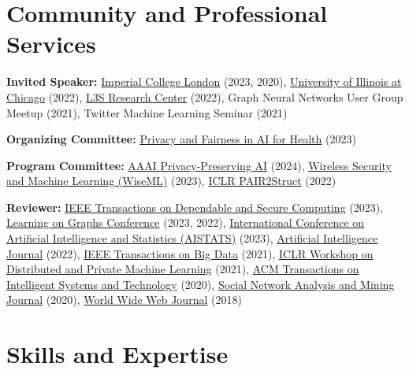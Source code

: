 \documentclass[11pt]{article}
\begin{document}
\section{Community and Professional Services}

\begin{outerlist}
  \item \textbf{Invited Speaker:}\quad
  \href{https://www.imperial.ac.uk/}{Imperial College London} (2023, 2020), \href{https://www.uic.edu/}{University of Illinois at Chicago} (2022), \href{https://www.l3s.de/}{L3S Research Center} (2022), Graph Neural Networks User Group Meetup (2021), Twitter Machine Learning Seminar (2021)

	\item \textbf{Organizing Committee:}\quad
	\href{https://priv-fair-ai-uk.github.io}{Privacy and Fairness in AI for Health} (2023)

	\item \textbf{Program Committee:}\quad
  \href{https://ppai-workshop.github.io/}{AAAI Privacy-Preserving AI} (2024),
	\href{https://wisec2023.surrey.ac.uk/wiseml2023/}{Wireless Security and Machine Learning (WiseML)} (2023),
	\href{https://pair2struct-workshop.github.io/}{ICLR PAIR2Struct} (2022)

	\item \textbf{Reviewer:}\quad
	\href{https://ieeexplore.ieee.org/xpl/aboutJournal.jsp?punumber=8858}{IEEE Transactions on Dependable and Secure Computing} (2023),
	\href{https://logconference.org/}{Learning on Graphs Conference} (2023, 2022),
  \href{http://aistats.org/aistats2023/}{International Conference on Artificial Intelligence and Statistics (AISTATS)} (2023),
	\href{https://www.journals.elsevier.com/artificial-intelligence}{Artificial Intelligence Journal} (2022),
	\href{https://ieeexplore.ieee.org/xpl/RecentIssue.jsp?punumber=6687317}{IEEE Transactions on Big Data} (2021),
	\href{https://dp-ml.github.io/2021-workshop-ICLR/}{ICLR Workshop on Distributed and Private Machine Learning} (2021),
	\href{https://dl.acm.org/journal/tist}{ACM Transactions on Intelligent Systems and Technology} (2020),
	\href{https://www.springer.com/journal/13278}{Social Network Analysis and Mining Journal} (2020),
	\href{https://www.springer.com/journal/11280}{World Wide Web Journal} (2018)

\end{outerlist}

\section{Skills and Expertise}
\end{document}
